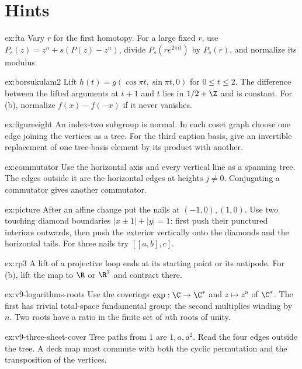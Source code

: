 \section{Hints}

\begin{hint}{ex:fta}
Vary $r$ for the first homotopy. For a large fixed $r$, use $P_s(z)=z^n+s(P(z)-z^n)$, divide $P_s(re^{2\pi it})$ by $P_s(r)$, and normalize its modulus.
\end{hint}
\begin{hint}{ex:borsukulam2}
Lift $h(t)=g(\cos\pi t,\sin\pi t,0)$ for $0\le t\le2$. The difference between the lifted arguments at $t+1$ and $t$ lies in $1/2+\Z$ and is constant. For (b), normalize $f(x)-f(-x)$ if it never vanishes.
\end{hint}
\begin{hint}{ex:figureeight}
An index-two subgroup is normal. In each coset graph choose one edge joining the vertices as a tree. For the third caption basis, give an invertible replacement of one tree-basis element by its product with another.
\end{hint}
\begin{hint}{ex:commutator}
Use the horizontal axis and every vertical line as a spanning tree. The edges outside it are the horizontal edges at heights $j\ne0$. Conjugating a commutator gives another commutator.
\end{hint}
\begin{hint}{ex:picture}
After an affine change put the nails at $(-1,0),(1,0)$. Use two touching diamond boundaries $|x\pm1|+|y|=1$: first push their punctured interiors outwards, then push the exterior vertically onto the diamonds and the horizontal tails. For three nails try $[[a,b],c]$.
\end{hint}
\begin{hint}{ex:rp3}
A lift of a projective loop ends at its starting point or its antipode. For (b), lift the map to $\R$ or $\R^2$ and contract there.
\end{hint}
\begin{hint}{ex:v9-logarithms-roots}
Use the coverings $\exp:\C\to\C^*$ and $z\mapsto z^n$ of $\C^*$. The first has trivial total-space fundamental group; the second multiplies winding by $n$. Two roots have a ratio in the finite set of $n$th roots of unity.
\end{hint}
\begin{hint}{ex:v9-three-sheet-cover}
Tree paths from $1$ are $1,a,a^2$. Read the four edges outside the tree. A deck map must commute with both the cyclic permutation and the transposition of the vertices.
\end{hint}
